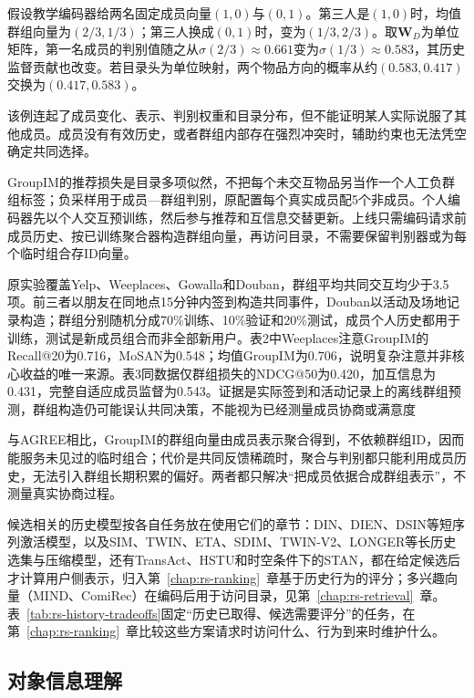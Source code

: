 假设教学编码器给两名固定成员向量$(1,0)$与$(0,1)$。第三人是$(1,0)$时，均值群组向量为$(2/3,1/3)$；第三人换成$(0,1)$时，变为$(1/3,2/3)$。取$\bm{W}_D$为单位矩阵，第一名成员的判别值随之从$\sigma(2/3)\approx0.661$变为$\sigma(1/3)\approx0.583$，其历史监督贡献也改变。若目录头为单位映射，两个物品方向的概率从约$(0.583,0.417)$交换为$(0.417,0.583)$。

该例连起了成员变化、表示、判别权重和目录分布，但不能证明某人实际说服了其他成员。成员没有有效历史，或者群组内部存在强烈冲突时，辅助约束也无法凭空确定共同选择。

GroupIM的推荐损失是目录多项似然，不把每个未交互物品另当作一个人工负群组标签；负采样用于成员—群组判别，原配置每个真实成员配5个非成员。个人编码器先以个人交互预训练，然后参与推荐和互信息交替更新。上线只需编码请求前成员历史、按已训练聚合器构造群组向量，再访问目录，不需要保留判别器或为每个临时组合存ID向量。

原实验覆盖Yelp、Weeplaces、Gowalla和Douban，群组平均共同交互均少于3.5项。前三者以朋友在同地点15分钟内签到构造共同事件，Douban以活动及场地记录构造；群组分别随机分成70\%训练、10\%验证和20\%测试，成员个人历史都用于训练，测试是新成员组合而非全部新用户。表2中Weeplaces注意GroupIM的Recall@20为0.716，MoSAN为0.548；均值GroupIM为0.706，说明复杂注意并非核心收益的唯一来源。表3同数据仅群组损失的NDCG@50为0.420，加互信息为0.431，完整自适应成员监督为0.543。证据是实际签到和活动记录上的离线群组预测，群组构造仍可能误认共同决策，不能视为已经测量成员协商或满意度

与AGREE相比，GroupIM的群组向量由成员表示聚合得到，不依赖群组ID，因而能服务未见过的临时组合；代价是共同反馈稀疏时，聚合与判别都只能利用成员历史，无法引入群组长期积累的偏好。两者都只解决“把成员依据合成群组表示”，不测量真实协商过程。

候选相关的历史模型按各自任务放在使用它们的章节：DIN、DIEN、DSIN等短序列激活模型，以及SIM、TWIN、ETA、SDIM、TWIN-V2、LONGER等长历史选集与压缩模型，还有TransAct、HSTU和时空条件下的STAN，都在给定候选后才计算用户侧表示，归入第~\ref{chap:rs-ranking}~章基于历史行为的评分；多兴趣向量（MIND、ComiRec）在编码后用于访问目录，见第~\ref{chap:rs-retrieval}~章。表~\ref{tab:rs-history-tradeoffs}固定“历史已取得、候选需要评分”的任务，在第~\ref{chap:rs-ranking}~章比较这些方案请求时访问什么、行为到来时维护什么。

\subsection{对象信息理解}
\label{sec:rs-item-understanding}

